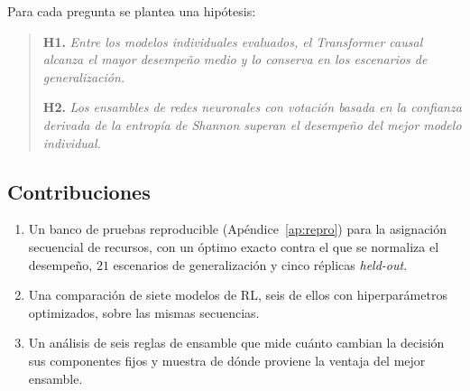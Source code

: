\documentclass[../00_Main/Main.tex]{subfiles}
\begin{document}
Para cada pregunta se plantea una hip\'otesis:

\begin{quote}
\textbf{H1.} \emph{Entre los modelos individuales evaluados, el
Transformer causal alcanza el mayor desempe\~no medio y lo conserva en
los escenarios de generalizaci\'on.}

\textbf{H2.} \emph{Los ensambles de redes neuronales con votaci\'on
basada en la confianza derivada de la entrop\'ia de Shannon superan el
desempe\~no del mejor modelo individual.}
\end{quote}

\subsection{Contribuciones}

\begin{enumerate}
    \item Un banco de pruebas reproducible (Ap\'endice~\ref{ap:repro}) para
    la asignaci\'on secuencial de recursos, con un \'optimo exacto contra el
    que se normaliza el desempe\~no, $21$ escenarios de generalizaci\'on y
    cinco r\'eplicas \emph{held-out}.
    \item Una comparaci\'on de siete modelos de RL, seis de ellos con
    hiperpar\'ametros optimizados, sobre las mismas secuencias.
    \item Un an\'alisis de seis reglas de ensamble que mide cu\'anto
    cambian la decisi\'on sus componentes fijos y muestra de d\'onde
    proviene la ventaja del mejor ensamble.
\end{enumerate}

\biblio %
\end{document}
